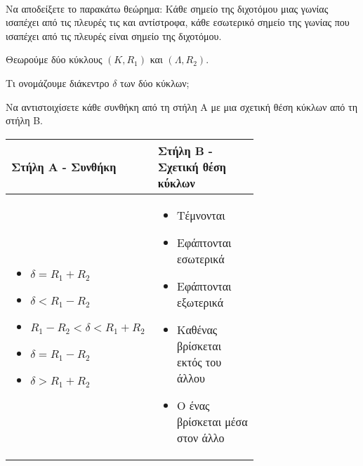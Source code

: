 \documentclass[twoside,nofonts,ektypwsh,math,spyros]{frontisthrio-diag}
\begin{document}
\begin{thema}
\item \mbox{}\\
\vspace{-7mm}
\begin{erwthma}
\item Να αποδείξετε το παρακάτω θεώρημα: Κάθε σημείο της διχοτόμου μιας γωνίας ισαπέχει από τις πλευρές τις και αντίστροφα, κάθε εσωτερικό σημείο της γωνίας που ισαπέχει από τις πλευρές είναι σημείο της διχοτόμου.
\item Θεωρούμε δύο κύκλους $ (K,R_1) $ και $ (\varLambda,R_2) $.
\begin{alist}
\item Τι ονομάζουμε διάκεντρο $ \delta $ των δύο κύκλων;
\item Να αντιστοιχίσετε κάθε συνθήκη από τη στήλη Α με μια σχετική θέση κύκλων από τη στήλη Β.
\begin{center}
\begin{tabular}{|m{0.3\linewidth} |m{0.4\linewidth}|}
\hline 
\rule[-2ex]{0pt}{5ex} \textbf{Στήλη Α - Συνθήκη} & \textbf{Στήλη Β - Σχετική θέση κύκλων} \\ 
\hline 
\rule[-2ex]{0pt}{5ex} \vspace{-5mm}\begin{itemize}
\item $ \delta=R_1+R_2 $
\item $ \delta<R_1-R_2 $
\item $ R_1-R_2<\delta<R_1+R_2 $
\item $ \delta=R_1-R_2 $
\item $ \delta>R_1+R_2 $
\end{itemize} & \vspace{1mm}\begin{itemize}
\item Τέμνονται
\item Εφάπτονται εσωτερικά
\item Εφάπτονται εξωτερικά
\item Καθένας βρίσκεται εκτός του άλλου
\item Ο ένας βρίσκεται μέσα στον άλλο
\end{itemize} \\ 
\hline 
\end{tabular}
\end{center}
\end{alist}
\end{erwthma}
\item \mbox{}\\

\end{thema}
\end{document}
